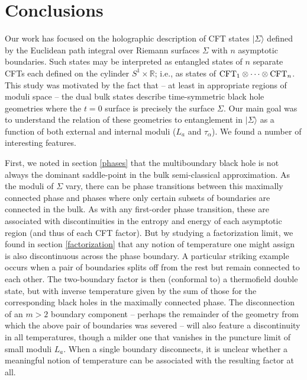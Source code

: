 \documentclass[12pt]{article}
\numberwithin{equation}{section}
\begin{document}
\section{Conclusions}
\label{conclude}

Our work has focused on the holographic description of CFT states $|\Sigma \rangle$ defined by the Euclidean path integral over
Riemann surfaces $\Sigma$ with $n$ asymptotic boundaries.  Such states may be interpreted as entangled states of $n$ separate CFTs each defined on the cylinder $S^1 \times \mathbb{R}$; i.e., as states of ${\rm CFT}{}_1 \otimes \dots \otimes {\rm CFT}{}_n$.  This study was motivated by the fact that -- at least in appropriate regions of moduli space -- the dual bulk states
describe time-symmetric black hole geometries where the $t=0$ surface is precisely the surface $\Sigma$.  Our main goal was to understand the relation of these geometries to entanglement in $|\Sigma \rangle$ as a function of both external and internal moduli ($L_a$ and
$\tau_\alpha$). We found a number of interesting features.

First, we noted in section \ref{phases} that the multiboundary black hole is not always the dominant saddle-point in the bulk semi-classical approximation.
As the moduli of $\Sigma$ vary, there can be phase transitions between this maximally connected phase and phases where only certain subsets of boundaries are connected in the bulk.  As with any first-order phase transition, these are associated with discontinuities in the entropy and energy of each asymptotic region (and thus of each CFT factor).  But by studying a factorization limit, we found in section \ref{factorization} that any notion of temperature one might assign is also discontinuous across the phase boundary.  A particular striking example occurs when
a pair of boundaries splits off from the rest but remain connected to each other.  The two-boundary factor is then (conformal to) a thermofield double state, but with inverse temperature given by the {\rm sum} of those for the corresponding black holes in the maximally connected phase. The disconnection of an $m > 2$ boundary component  -- perhaps the remainder of the geometry from which the above pair of boundaries was severed -- will also feature a discontinuity in all temperatures, though a milder one that vanishes in the puncture limit of small moduli $L_a$. When a single boundary disconnects, it is unclear whether a meaningful notion of temperature can be associated with the resulting factor at all.
\end{document}
